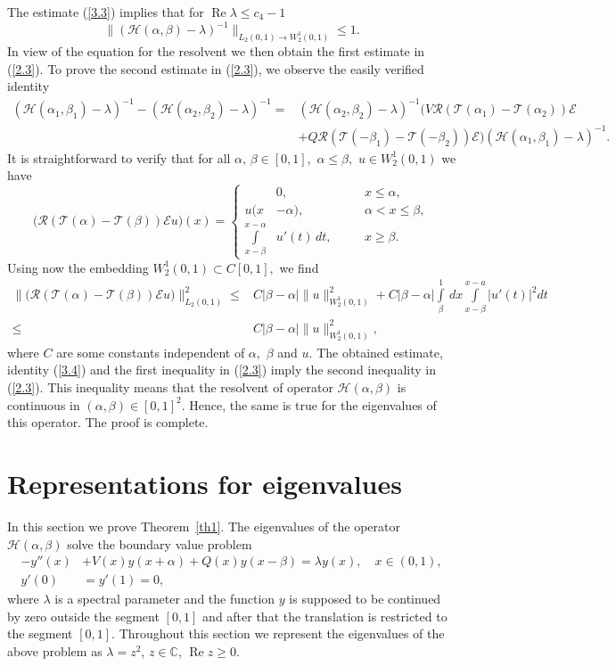 \documentclass[10pt, a4paper]{article}
\theoremstyle{plain}
\theoremstyle{definition}
\numberwithin{equation}{section}
\def\l{\lambda}
\def\a{\alpha}
\def\b{\beta}
\def\Op{\mathcal{H}}
\def\cR{\mathcal{R}}
\def\cE{\mathcal{E}}
\def\cT{\mathcal{T}}
\DeclareMathOperator{\RE}{Re}
\begin{document}
The estimate (\ref{3.3}) implies that  for $\RE\l\leqslant c_4-1$
\begin{equation*}
\|(\Op(\a,\b)-\l)^{-1}\|_{L_2(0,1)\to W_2^1(0,1)}\leqslant 1.
\end{equation*}
In view of the equation for the resolvent we then obtain the first estimate in (\ref{2.3}).
To prove the second estimate in (\ref{2.3}), we observe the easily verified identity
\begin{equation}\label{3.4}
\begin{aligned}
(\Op(\a_1,\b_1)-\l)^{-1}-(\Op(\a_2,\b_2)-\l)^{-1}=&(\Op(\a_2,\b_2)-\l)^{-1}
\big(V\cR(\cT(\a_1)-\cT(\a_2))\cE
\\
&+Q\cR(\cT(-\b_1)-\cT(-\b_2))\cE\big)
(\Op(\a_1,\b_1)-\l)^{-1}.
\end{aligned}
\end{equation}
It is straightforward to verify  that for all $\a,\,\b\in[0,1],$ $\a\leqslant \b,$ $u\in W_2^1(0,1)$ we have
\begin{equation*}%
\big(\cR(\cT(\a)-\cT(\b))\cE u\big)(x)=\left\{
\begin{aligned}
& 0, && x\leqslant \a,
\\
u(x&-\a), && \a<x\leqslant \b,
\\
\int\limits_{x-\b}^{x-\a}& u'(t)\,dt,\quad && x\geqslant \b.
\end{aligned}
\right.
\end{equation*}
Using now the embedding $W_2^1(0,1)\subset C[0,1],$ we find
\begin{align*}
\|\big(\cR(\cT(\a)-\cT(\b))\cE u\big)\|_{L_2(0,1)}^2 \leqslant &C |\b-\a|\|u\|_{W_2^1(0,1)}^2 + C |\b-\a|\int\limits_{\b}^{1}\,dx\int\limits_{x-\b}^{x-a}  |u'(t)|^2 dt
\\
\leqslant & C|\b-\a| \|u\|_{W_2^1(0,1)}^2,
\end{align*}
where $C$ are some constants independent of $\a,$ $\b$ and $u.$ The obtained estimate,  identity (\ref{3.4}) and the first inequality in (\ref{2.3}) imply the second inequality in (\ref{2.3}).   This inequality means that the resolvent of operator $\Op(\a,\b)$ is continuous in $(\a,\b)\in[0,1]^2.$ Hence, the same is true for the eigenvalues of this operator.  The proof is complete.

\section{Representations for eigenvalues}\label{sec2}

In this section we prove Theorem~\ref{th1}. The eigenvalues of the operator $\mathcal{H}(\alpha, \beta)$ solve
the boundary value problem
\begin{align}
-y''(x) &+ V(x)y(x+\alpha)+Q(x)y(x-\beta) =\lambda y(x), \quad x\in(0,1),\label{bp1.1}
\\
y'(0) &= y'(1)=0, \label{bp2.1}
\end{align}
where $\lambda$ is a spectral parameter and the function $y$ is supposed to be continued by zero outside the segment $[0, 1]$
and after that the translation is restricted to the segment $[0, 1]$. Throughout this section we represent the eigenvalues
of the above problem as $\lambda=z^2$, $z\in\mathds{C}$, $\RE z\geqslant 0$.
\end{document}

